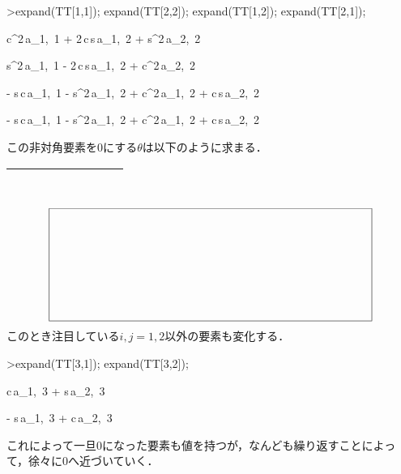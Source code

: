 \begin{MapleInput}
>expand(TT[1,1]);
expand(TT[2,2]);
expand(TT[1,2]);
expand(TT[2,1]);
\end{MapleInput}
\begin{MapleOutput}
c^{2}\,{a_{1, \,1}} + 2\,c\,s\,{a_{1, \,2}} + s^{2}\,{a_{2, \,2}}
\end{MapleOutput}
\begin{MapleOutput}
s^{2}\,{a_{1, \,1}} - 2\,c\,s\,{a_{1, \,2}} + c^{2}\,{a_{2, \,2}}
\end{MapleOutput}
\begin{MapleOutput}
 - s\,c\,{a_{1, \,1}} - s^{2}\,{a_{1, \,2}} + c^{2}\,{a_{1, \,2}}
 + c\,s\,{a_{2, \,2}}
\end{MapleOutput}
\begin{MapleOutput}
 - s\,c\,{a_{1, \,1}} - s^{2}\,{a_{1, \,2}} + c^{2}\,{a_{1, \,2}}
 + c\,s\,{a_{2, \,2}}
\end{MapleOutput}
この非対角要素を0にする$\theta$は以下のように求まる．
\ifHIKI
\begin{tabular}{|c|}
\hline
　　　　　　　　 \\ 
\hline
\end{tabular}
\else
\begin{equation*}
\setlength{\unitlength}{1cm}
\begin{picture}(10,3.5)
\put(0,0){\framebox(10,3.5){}}
\end{picture}
\end{equation*}
\fi
このとき注目している$i,j=1,2$以外の要素も変化する．
\begin{MapleInput}
>expand(TT[3,1]);
expand(TT[3,2]);
\end{MapleInput}
\begin{MapleOutput}
c\,{a_{1, \,3}} + s\,{a_{2, \,3}}
\end{MapleOutput}
\begin{MapleOutput}
 - s\,{a_{1, \,3}} + c\,{a_{2, \,3}}
\end{MapleOutput}
これによって一旦0になった要素も値を持つが，なんども繰り返すことによって，徐々に0へ近づいていく．